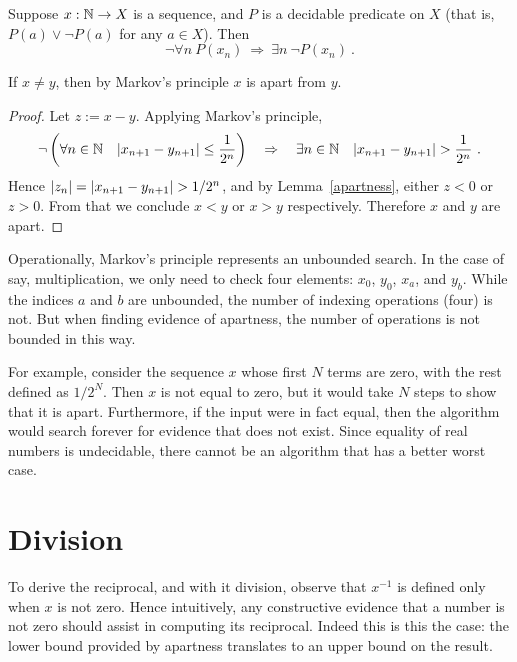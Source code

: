 \documentclass[leqno]{report}
\begin{document}
\begin{Definition}
    Suppose $x : \mathbb{N} \rightarrow X$ is a sequence, and $P$ is a decidable predicate on $X$ (that is, $P(a) \vee \neg P(a)$ for any $a \in X$). Then
    \[
        \neg \forall n\ P(x_n)
        \ \Rightarrow\ \exists n\ \neg P(x_n) \ .
    \]
\end{Definition}

\begin{Proposition}[Apartness]
    If $x \neq y$, then by Markov's principle $x$ is apart from $y$.
\end{Proposition}

\begin{proof}
    Let $z := x - y$. Applying Markov's principle,
    \[
        \neg \left( \fa{n \in \N}{\abs{x_{n+1} - y_{n+1}} \leq \frac{1}{2^n}} \right)
        \quad \Rightarrow \quad
        \ex{n \in \N}{\abs{x_{n+1} - y_{n+1}} > \frac{1}{2^n}} \ .
    \]
    Hence $\left| z_n \right| = \left| x_{n+1} - y_{n+1} \right| > 1/2^n$, and by Lemma~\ref{apartness}, either $z < 0$ or $z > 0$. From that we conclude $x < y$ or $x > y$ respectively. Therefore $x$ and $y$ are apart.
\end{proof}

Operationally, Markov's principle represents an unbounded search. In the case of say, multiplication, we only need to check four elements: $x_0$, $y_0$, $x_a$, and $y_b$. While the indices $a$ and $b$ are unbounded, the number of indexing operations (four) is not. But when finding evidence of apartness, the number of operations is not bounded in this way.

For example, consider the sequence $x$ whose first $N$ terms are zero, with the rest defined as $1/2^N$. Then $x$ is not equal to zero, but it would take $N$ steps to show that it is apart. Furthermore, if the input were in fact equal, then the algorithm would search forever for evidence that does not exist. Since equality of real numbers is undecidable, there cannot be an algorithm that has a better worst case.

\section{Division}

To derive the reciprocal, and with it division, observe that $x^{-1}$ is defined only when $x$ is not zero. Hence intuitively, any constructive evidence that a number is not zero should assist in computing its reciprocal. Indeed this is this the case: the lower bound provided by apartness translates to an upper bound on the result.
\end{document}
